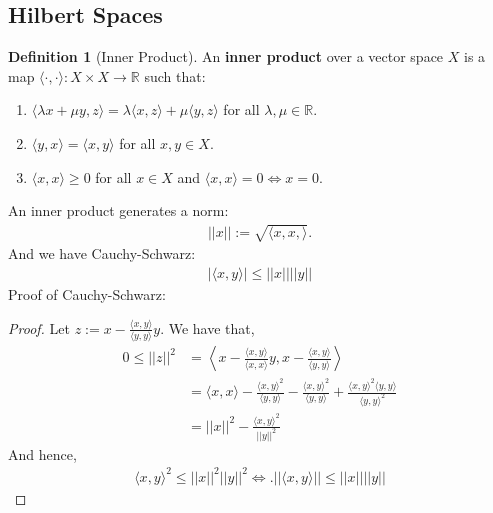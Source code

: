 \documentclass[psamsfonts]{amsart}
\theoremstyle{definition}
\newtheorem{defn}[thm]{Definition}
\theoremstyle{remark}
\newcommand{\R}[0]{\mathbb{R}}
\numberwithin{equation}{section}
\begin{document}
\subsection{Hilbert Spaces}

\begin{defn}[Inner Product]
	An \textbf{inner product} over a vector space \( X \) is a map \( \langle \cdot, \cdot \rangle: X \times X \rightarrow \R \) such that:
	\begin{enumerate}
		\item \( \langle \lambda x + \mu y, z \rangle = \lambda \langle x, z \rangle + \mu \langle y, z \rangle \) for all \( \lambda, \mu \in \R \).
		\item \( \langle y, x \rangle = \langle x, y \rangle \) for all \( x, y \in X \). 
		\item \( \langle x, x \rangle \geq 0 \) for all \( x \in X \) and \( \langle x, x \rangle = 0 \iff x =0 \).
	\end{enumerate}
\end{defn}
An inner product generates a norm: 
\begin{align*}
	|| x || := \sqrt{ \langle x, x, \rangle}.
\end{align*}
And we have Cauchy-Schwarz: 
\begin{align*}
	\boxed{|\langle x, y \rangle | \leq || x || || y ||}
\end{align*}
Proof of Cauchy-Schwarz:
\begin{proof}
	Let \( z := x - \frac{\langle x, y \rangle}{\langle y, y \rangle} y \). We have that, 
	\begin{align*}
		0 \leq || z ||^2 &  = \left\langle x - \frac{\langle x, y \rangle}{\langle x, x \rangle}y, x - \frac{\langle x, y \rangle}{\langle y, y \rangle} \right\rangle  \\
		& = \langle x, x \rangle - \frac{\langle x, y \rangle^2}{\langle y, y \rangle} - \frac{\langle x, y \rangle^2}{\langle y, y \rangle} + \frac{\langle x, y \rangle^2 \langle y, y \rangle}{\langle y, y \rangle^2} \\
		& = ||x||^2 - \frac{\langle x, y \rangle^2}{||y||^2}
	\end{align*}
	And hence, 
	\begin{align*}
		\langle x, y \rangle^2 \leq || x||^2 ||y||^2 \iff \boxed{. || \langle x, y \rangle || \leq || x || || y || }
	\end{align*}
\end{proof}
\end{document}
